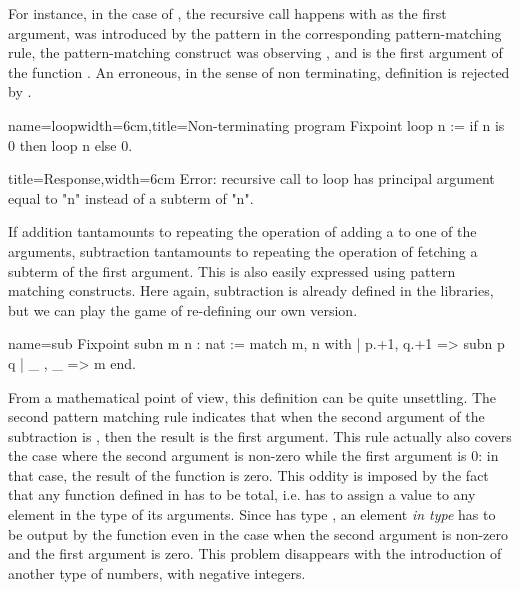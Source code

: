 For instance, in the case of , the recursive call happens
with  as the first argument,  was introduced by the pattern 
in the corresponding pattern-matching rule, the pattern-matching
construct was observing , and  is the first argument of the
function .  An erroneous, in the sense of non terminating,
definition is rejected by \Coq{}.

\begin{coq}{name=loop}{width=6cm,title=Non-terminating program}
Fixpoint loop n :=
 if n is 0 then loop n else 0.
$~$
\end{coq}
\begin{coqout}{}{title=Response,width=6cm}
Error: recursive call to loop has
principal argument equal to  "n"
instead of a subterm of "n".
\end{coqout}

%
%
If addition tantamounts to repeating the operation of adding a 
to one of the arguments, subtraction tantamounts to repeating the
operation of fetching a subterm of the first argument.  This is also
easily expressed using pattern matching constructs.  Here again,
subtraction is already defined in the libraries, but we can play the game
of re-defining our own version.

\begin{coq}{name=sub}{}
Fixpoint subn m n : nat :=
  match m, n with
  | p.+1, q.+1 => subn p q
  | _ , _ => m
  end.
\end{coq}
From a mathematical point of view, this definition can be quite
unsettling.  The second pattern matching rule indicates that when
the second argument of the subtraction is , then the result is
the first argument.  This rule actually also covers the case where the
second argument is non-zero while the first argument is 0: in that
case, the result of the function is zero. This oddity is imposed by
the fact that any function defined in \Coq{} has to be total, i.e. has
to assign a value to any element in the type of its arguments. Since
 has type , an element \emph{in type}  has to be
output by the function even in the case when  the second argument is
non-zero and the first argument is zero. This problem disappears with
the introduction of another type of numbers, with negative integers.

